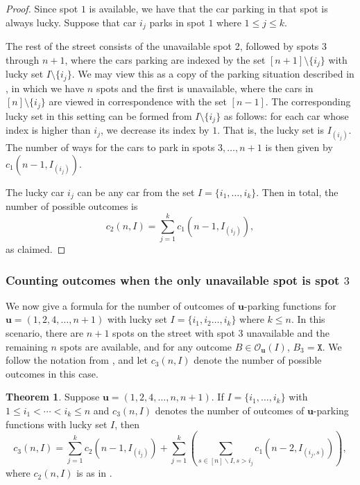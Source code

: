 \documentclass[reqno]{amsart}
\newcommand{\X}{\texttt{X}}
\theoremstyle{definition}
\newtheorem{theorem}{Theorem}[section]
\theoremstyle{remark}
\newcommand{\out}{\mathcal{O}}
\newcommand{\bsy}{\boldsymbol}
\begin{document}
\begin{proof}
    Since spot $1$ is available, we have that the car parking in that spot is always lucky. Suppose that car $i_j$ parks in spot $1$ where $1\leq j \leq k$. 
    
    The rest of the street consists of the unavailable spot 2, followed by spots $3$ through $n+1$, where the cars parking are indexed by the set $[n+1]\setminus \{i_j\}$ with lucky set $I \setminus\{i_j\}$.
    We may view this as a copy of the parking situation described in , in which
     we have $n$ spots and the first is unavailable, where the cars in $[n]\setminus \{i_j\}$ are viewed in correspondence with the set $[n-1]$. The corresponding lucky set in this setting can be formed from $I\setminus \{i_j\}$
     as follows: for each car whose index is higher than $i_j$, we decrease its index by $1$. That is, the lucky set is $I_{(i_j)}$. The number of ways for the cars to park in spots $3,\ldots, n+1$ is then given by $c_1 (n-1,I_{(i_j)})$.

     The lucky car $i_j$ can be any car from the set $I = \{i_1,\ldots, i_k\}$. Then in total, the number of possible outcomes is
     \[
     c_2(n, I)=\sum_{j=1}^k c_1 (n-1,I_{(i_j)}),
     \]
     as claimed.
\end{proof}


\subsubsection{Counting outcomes when the only unavailable spot is spot $3$}\label{subsec: spot 3 is unavailable}

We now give a formula for the number of outcomes of $\bsy{u}$-parking functions for $\bsy{u} = (1,2,4, \dots, n+1)$ with lucky set $I = \{i_1, i_2 \ldots, i_k\}$ where $k\leq n$. In this scenario, there are $n+1$ spots on the street with spot $3$ unavailable and the remaining $n$ spots are available, and for any outcome $B\in \out_{\bsy{u}}(I)$, $B_3=\X$. We follow the notation from , and let $c_3(n,I)$ denote the number of possible outcomes in this case.

 \begin{theorem}
Suppose $\bsy{u}=(1,2,4,\ldots, n,n+1)$.
    If $I = \{i_1, \dots, i_k\}$ {with $1\leq i_1 <\cdots < i_{k} \leq n$} and $c_3(n,I)$ denotes the number of outcomes of $\bsy u$-parking functions with lucky set $I$, then 
\[ c_3(n,I) = \sum_{j = 1}^k c_2(n-1, I_{(i_j)}) + \sum_{j = 1}^k \left(\sum_{s \in [n] \backslash I, s > i_j} c_1(n-2, I_{(i_j,s)})\right),\]
where $c_2(n,I)$ is as in .
\end{theorem}
\end{document}
